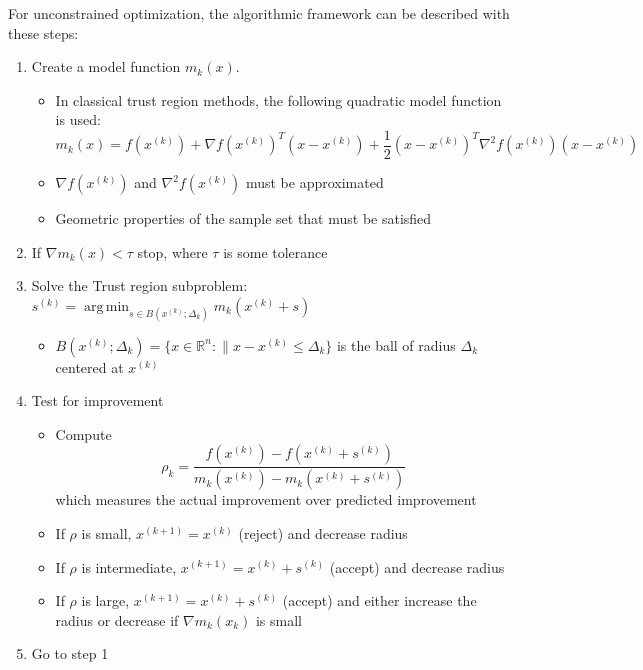 \documentclass{article}
\DeclareMathOperator*{\argmin}{arg\,min}
\begin{document}
For unconstrained optimization, the algorithmic framework can be described with these steps:

\begin{enumerate}
	\item Create a model function $m_k(x)$.
	\begin {itemize}
		\item In classical trust region methods, the following quadratic model function is used:
		\[
		m_k(x) = f(x^{(k)}) + \nabla f(x^{(k)})^T (x-x^{(k)}) + \frac 1 2 (x-x^{(k)})^T\nabla^2f(x^{(k)})(x-x^{(k)})
		\]
	\end{itemize}
	\begin{itemize}
		\item $\nabla f(x^{(k)})$ and $\nabla^2 f(x^{(k)})$ must be approximated
		\item Geometric properties of the sample set that must be satisfied
	\end{itemize}
	
	\item If $\nabla m_k(x) < \tau$ stop, where $\tau$ is some tolerance
	
	\item Solve the Trust region subproblem: $s^{(k)} = \argmin_{s\in B(x^{(k)};\Delta_k)} m_k(x^{(k)} + s)$
	\begin {itemize}
		\item $B(x^{(k)};\Delta_k) = \{ x \in \mathbb{R}^n : \| x - x^{(k)} \le \Delta_k \}$ 
		is the ball of radius $\Delta_k$ centered at $x^{(k)}$
	\end{itemize}
	
	\item Test for improvement
	\begin{itemize}
		\item Compute
\begin{equation}
\label{rho}
\rho_k = \frac{f(x^{(k)}) - f(x^{(k)}+s^{(k)})}{m_k(x^{(k)}) - m_k(x^{(k)}+s^{(k)})}
\end{equation}
which measures the actual improvement over predicted improvement
		\item If $\rho$ is small, $x^{(k+1)}=x^{(k)}$ (reject) and decrease radius
		\item If $\rho$ is intermediate, $x^{(k+1)}=x^{(k)}+s^{(k)}$ (accept) and decrease radius
		\item If $\rho$ is large, $x^{(k+1)}=x^{(k)}+s^{(k)}$ (accept) and either increase the radius or decrease if $\nabla m_k(x_k)$ is small
	\end{itemize}
	
	\item Go to step 1
\end{enumerate}
\end{document}
